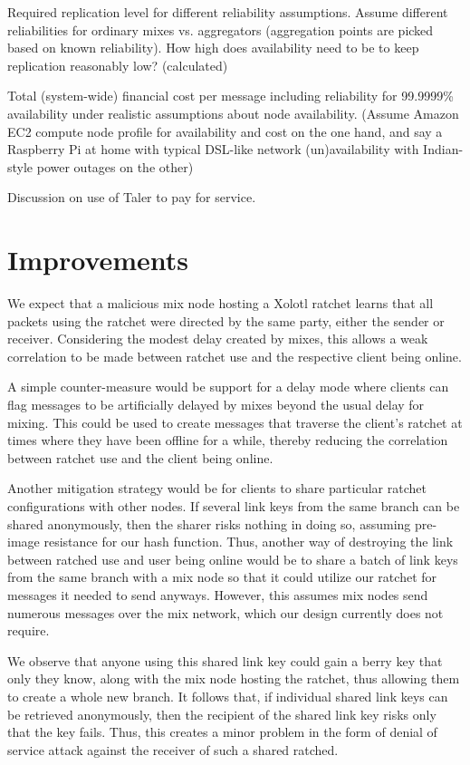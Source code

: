 \documentclass[twoside,letterpaper]{llncs}
\begin{document}
Required replication level for different reliability assumptions.
Assume different reliabilities for ordinary mixes vs. aggregators
(aggregation points are picked based on known reliability).  How high
does availability need to be to keep replication reasonably low?
(calculated)

Total (system-wide) financial cost per message including reliability
for 99.9999\% availability under realistic assumptions about node
availability. (Assume Amazon EC2 compute node profile for availability
and cost on the one hand, and say a Raspberry Pi at home with typical
DSL-like network (un)availability with Indian-style power outages on
the other)

Discussion on use of Taler to pay for service.



\section{Improvements}

We expect that a malicious mix node hosting a Xolotl ratchet learns
that all packets using the ratchet were directed by the same party,
either the sender or receiver.  Considering the modest delay created
by mixes, this allows a weak correlation to be made between ratchet
use and the respective client being online.

A simple counter-measure would be support for a delay mode where
clients can flag messages to be artificially delayed by mixes beyond
the usual delay for mixing.  This could be used to create messages
that traverse the client's ratchet at times where they have been
offline for a while, thereby reducing the correlation between ratchet
use and the client being online.

Another mitigation strategy would be for clients
to share particular ratchet configurations with other nodes.
If several link keys from the same branch can be shared anonymously,
then the sharer risks nothing in doing so, assuming pre-image
resistance for our hash function.  Thus, another way of destroying the
link between ratched use and user being online would be to share a
batch of link keys from the same branch with a mix node so that it
could utilize our ratchet for messages it needed to send anyways.
However, this assumes mix nodes send numerous messages over the mix
network, which our design currently does not require.

We observe that anyone using this shared link key could gain a berry
key that only they know, along with the mix node hosting the ratchet,
thus allowing them to create a whole new branch.  It follows that,
if individual shared link keys can be retrieved anonymously, then
the recipient of the shared link key risks only that the key fails.
Thus, this creates a minor problem in the form of denial of service
attack against the receiver of such a shared ratched.
\end{document}
